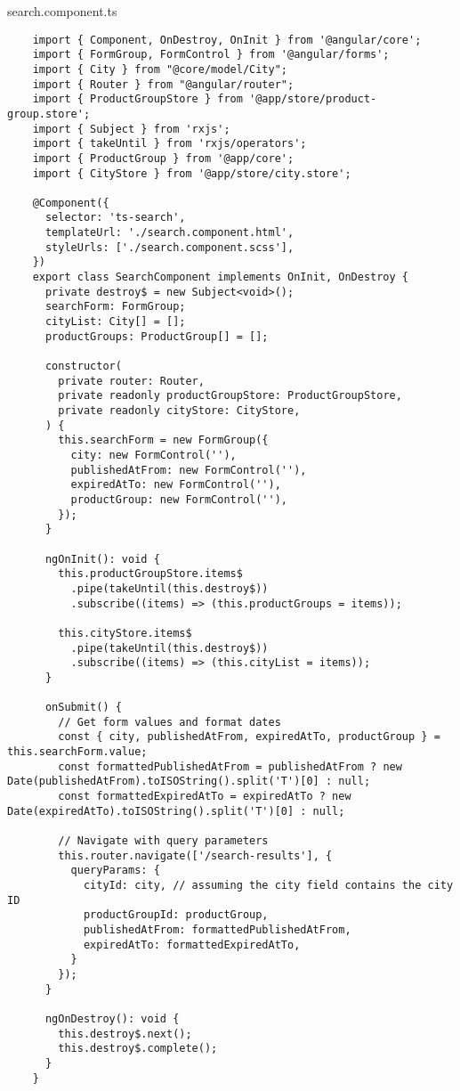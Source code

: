 search.component.ts
\begin{lstlisting}
    import { Component, OnDestroy, OnInit } from '@angular/core';
    import { FormGroup, FormControl } from '@angular/forms';
    import { City } from "@core/model/City";
    import { Router } from "@angular/router";
    import { ProductGroupStore } from '@app/store/product-group.store';
    import { Subject } from 'rxjs';
    import { takeUntil } from 'rxjs/operators';
    import { ProductGroup } from '@app/core';
    import { CityStore } from '@app/store/city.store';
    
    @Component({
      selector: 'ts-search',
      templateUrl: './search.component.html',
      styleUrls: ['./search.component.scss'],
    })
    export class SearchComponent implements OnInit, OnDestroy {
      private destroy$ = new Subject<void>();
      searchForm: FormGroup;
      cityList: City[] = [];
      productGroups: ProductGroup[] = [];
    
      constructor(
        private router: Router,
        private readonly productGroupStore: ProductGroupStore,
        private readonly cityStore: CityStore,
      ) {
        this.searchForm = new FormGroup({
          city: new FormControl(''),
          publishedAtFrom: new FormControl(''),
          expiredAtTo: new FormControl(''),
          productGroup: new FormControl(''),
        });
      }
    
      ngOnInit(): void {
        this.productGroupStore.items$
          .pipe(takeUntil(this.destroy$))
          .subscribe((items) => (this.productGroups = items));
    
        this.cityStore.items$
          .pipe(takeUntil(this.destroy$))
          .subscribe((items) => (this.cityList = items));
      }
    
      onSubmit() {
        // Get form values and format dates
        const { city, publishedAtFrom, expiredAtTo, productGroup } = this.searchForm.value;
        const formattedPublishedAtFrom = publishedAtFrom ? new Date(publishedAtFrom).toISOString().split('T')[0] : null;
        const formattedExpiredAtTo = expiredAtTo ? new Date(expiredAtTo).toISOString().split('T')[0] : null;
    
        // Navigate with query parameters
        this.router.navigate(['/search-results'], {
          queryParams: {
            cityId: city, // assuming the city field contains the city ID
            productGroupId: productGroup,
            publishedAtFrom: formattedPublishedAtFrom,
            expiredAtTo: formattedExpiredAtTo,
          }
        });
      }
    
      ngOnDestroy(): void {
        this.destroy$.next();
        this.destroy$.complete();
      }
    }    
\end{lstlisting}

